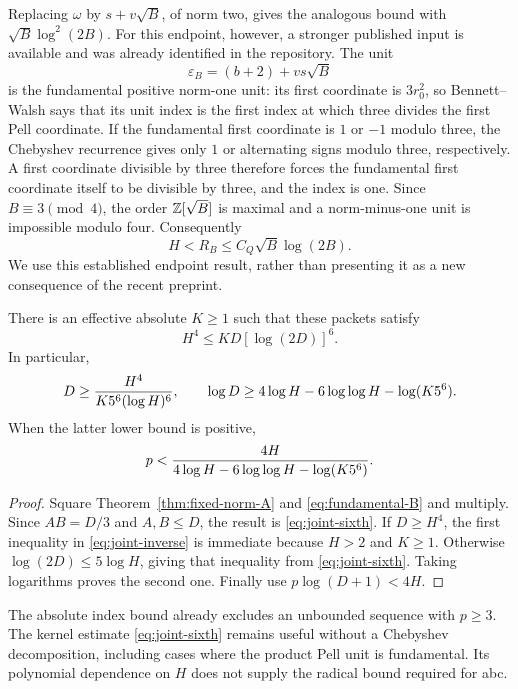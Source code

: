 Replacing $\omega$ by $s+v\sqrt B$, of norm two, gives the analogous
bound with $\sqrt B\log^2(2B)$. For this endpoint, however, a stronger
published input is available and was already identified in the repository.
The unit
\[
 \varepsilon_B=(b+2)+vs\sqrt B
\]
is the fundamental positive norm-one unit: its first coordinate is $3r_0^2$,
so Bennett--Walsh \cite[Theorem~1.2]{BW} says that its unit index is the
first index at which three divides the first Pell coordinate. If the
fundamental first coordinate is $1$ or $-1$ modulo three, the Chebyshev
recurrence gives only $1$ or alternating signs modulo three, respectively.
A first coordinate divisible by three therefore forces the fundamental first
coordinate itself to be divisible by three, and the index is one.
Since $B\equiv3\pmod4$, the order $\mathbb Z[\sqrt B]$ is maximal and a
norm-minus-one unit is impossible modulo four. Consequently
\begin{equation}\label{eq:fundamental-B}
 H<R_B\le C_Q\sqrt B\log(2B).
\end{equation}
We use this established endpoint result, rather than presenting it as a
new consequence of the recent preprint.

\begin{corollary}\label{cor:joint-sixth}
There is an effective absolute $K\ge1$ such that these packets satisfy
\begin{equation}\label{eq:joint-sixth}
 H^4\le K D[\log(2D)]^6.
\end{equation}
In particular,
\begin{equation}\label{eq:joint-inverse}
 D\ge\frac{H^4}{K5^6(\log H)^6},\qquad
 \log D\ge4\log H-6\log\log H-\log(K5^6).
\end{equation}
When the latter lower bound is positive,
\[
 p<\frac{4H}{4\log H-6\log\log H-\log(K5^6)}.
\]
\end{corollary}
\begin{proof}
Square Theorem~\ref{thm:fixed-norm-A} and \eqref{eq:fundamental-B} and
multiply. Since $AB=D/3$ and $A,B\le D$, the result is
\eqref{eq:joint-sixth}. If $D\ge H^4$, the first inequality in
\eqref{eq:joint-inverse} is immediate because $H>2$ and $K\ge1$.
Otherwise $\log(2D)\le5\log H$, giving that inequality from
\eqref{eq:joint-sixth}. Taking logarithms proves the second one.
Finally use $p\log(D+1)<4H$.
\end{proof}

The absolute index bound already excludes an unbounded sequence with
$p\ge3$. The kernel estimate \eqref{eq:joint-sixth} remains useful without
a Chebyshev decomposition, including cases where the product Pell unit
is fundamental. Its polynomial dependence on $H$ does not supply the
radical bound required for abc.

